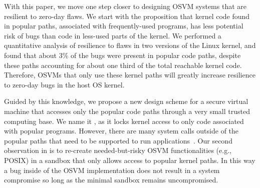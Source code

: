 

With this paper, we move one step closer to designing OSVM systems that are
resilient to zero-day flaws.   We start
 with the proposition that kernel code found in popular paths, associated with frequently-used programs,
has less potential risk of bugs than code in less-used parts of the kernel.
We performed a quantitative analysis of resilience
  to flaws in two versions of the Linux kernel, and
found that about 3\% of the bugs were present in popular code paths,
despite these paths accounting for about one third of the total reachable 
kernel code.  
Therefore, OSVMs that only use these kernel paths will 
greatly increase resilience to zero-day bugs in the host OS kernel.

Guided by this knowledge, we propose a new design scheme for a secure virtual machine that
accesses only the popular code paths through a very small trusted computing base.
We name it \lip, as it locks kernel access to only code
associated with popular programs. %
However, there are many system calls outside of the popular paths that need to 
be supported to run applications~\cite{tsai2016study}.  Our second
observation in \lip is to re-create needed-but-risky OSVM functionalities
(e.g., POSIX) in a 
sandbox that only allows access to popular kernel paths.  In this way a bug
inside of the OSVM implementation does not result in a system compromise
so long as the minimal sandbox remains uncompromised.

